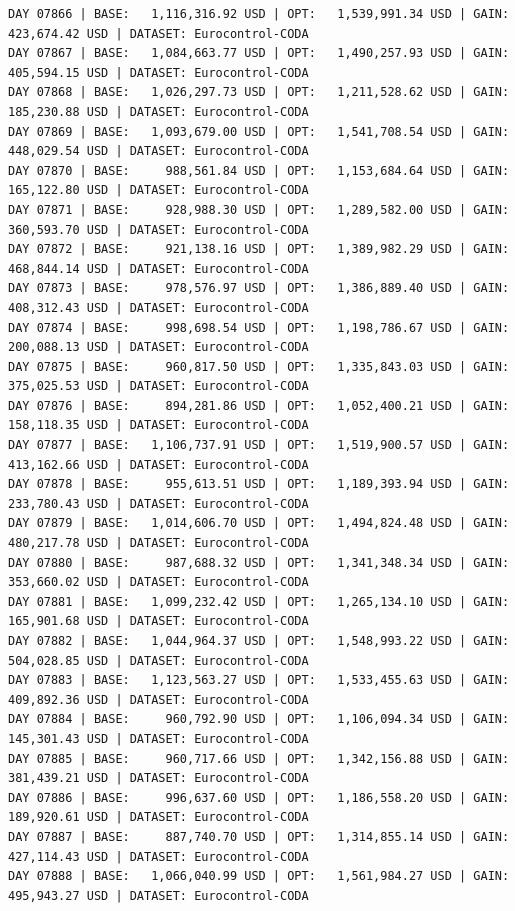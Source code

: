 \documentclass[11pt,a4paper]{article}
\begin{document}
\begin{verbatim}
DAY 07866 | BASE:   1,116,316.92 USD | OPT:   1,539,991.34 USD | GAIN: 423,674.42 USD | DATASET: Eurocontrol-CODA
DAY 07867 | BASE:   1,084,663.77 USD | OPT:   1,490,257.93 USD | GAIN: 405,594.15 USD | DATASET: Eurocontrol-CODA
DAY 07868 | BASE:   1,026,297.73 USD | OPT:   1,211,528.62 USD | GAIN: 185,230.88 USD | DATASET: Eurocontrol-CODA
DAY 07869 | BASE:   1,093,679.00 USD | OPT:   1,541,708.54 USD | GAIN: 448,029.54 USD | DATASET: Eurocontrol-CODA
DAY 07870 | BASE:     988,561.84 USD | OPT:   1,153,684.64 USD | GAIN: 165,122.80 USD | DATASET: Eurocontrol-CODA
DAY 07871 | BASE:     928,988.30 USD | OPT:   1,289,582.00 USD | GAIN: 360,593.70 USD | DATASET: Eurocontrol-CODA
DAY 07872 | BASE:     921,138.16 USD | OPT:   1,389,982.29 USD | GAIN: 468,844.14 USD | DATASET: Eurocontrol-CODA
DAY 07873 | BASE:     978,576.97 USD | OPT:   1,386,889.40 USD | GAIN: 408,312.43 USD | DATASET: Eurocontrol-CODA
DAY 07874 | BASE:     998,698.54 USD | OPT:   1,198,786.67 USD | GAIN: 200,088.13 USD | DATASET: Eurocontrol-CODA
DAY 07875 | BASE:     960,817.50 USD | OPT:   1,335,843.03 USD | GAIN: 375,025.53 USD | DATASET: Eurocontrol-CODA
DAY 07876 | BASE:     894,281.86 USD | OPT:   1,052,400.21 USD | GAIN: 158,118.35 USD | DATASET: Eurocontrol-CODA
DAY 07877 | BASE:   1,106,737.91 USD | OPT:   1,519,900.57 USD | GAIN: 413,162.66 USD | DATASET: Eurocontrol-CODA
DAY 07878 | BASE:     955,613.51 USD | OPT:   1,189,393.94 USD | GAIN: 233,780.43 USD | DATASET: Eurocontrol-CODA
DAY 07879 | BASE:   1,014,606.70 USD | OPT:   1,494,824.48 USD | GAIN: 480,217.78 USD | DATASET: Eurocontrol-CODA
DAY 07880 | BASE:     987,688.32 USD | OPT:   1,341,348.34 USD | GAIN: 353,660.02 USD | DATASET: Eurocontrol-CODA
DAY 07881 | BASE:   1,099,232.42 USD | OPT:   1,265,134.10 USD | GAIN: 165,901.68 USD | DATASET: Eurocontrol-CODA
DAY 07882 | BASE:   1,044,964.37 USD | OPT:   1,548,993.22 USD | GAIN: 504,028.85 USD | DATASET: Eurocontrol-CODA
DAY 07883 | BASE:   1,123,563.27 USD | OPT:   1,533,455.63 USD | GAIN: 409,892.36 USD | DATASET: Eurocontrol-CODA
DAY 07884 | BASE:     960,792.90 USD | OPT:   1,106,094.34 USD | GAIN: 145,301.43 USD | DATASET: Eurocontrol-CODA
DAY 07885 | BASE:     960,717.66 USD | OPT:   1,342,156.88 USD | GAIN: 381,439.21 USD | DATASET: Eurocontrol-CODA
DAY 07886 | BASE:     996,637.60 USD | OPT:   1,186,558.20 USD | GAIN: 189,920.61 USD | DATASET: Eurocontrol-CODA
DAY 07887 | BASE:     887,740.70 USD | OPT:   1,314,855.14 USD | GAIN: 427,114.43 USD | DATASET: Eurocontrol-CODA
DAY 07888 | BASE:   1,066,040.99 USD | OPT:   1,561,984.27 USD | GAIN: 495,943.27 USD | DATASET: Eurocontrol-CODA

\end{verbatim}
\end{document}
